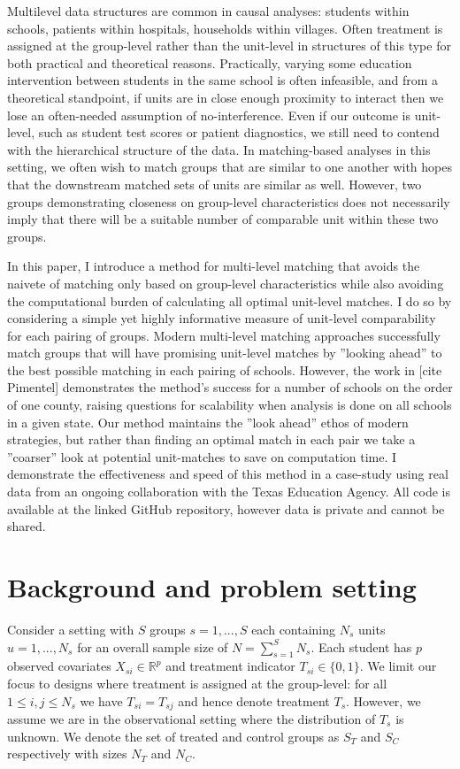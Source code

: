 \documentclass[aoas]{imsart}
\theoremstyle{plain}
\theoremstyle{definition}
\begin{document}
Multilevel data structures are common in causal analyses: students within schools, patients within hospitals,
households within villages. Often treatment is assigned at the group-level rather than the unit-level in structures of this type for both practical and theoretical reasons. Practically, varying some education intervention
between students in the same school is often infeasible, and from a theoretical standpoint, if units are in
close enough proximity to interact then we lose an often-needed assumption of no-interference. Even if our
outcome is unit-level, such as student test scores or patient diagnostics, we still need to contend with the
hierarchical structure of the data. In matching-based analyses in this setting, we often wish to match groups
that are similar to one another with hopes that the downstream matched sets of units are similar as well.
However, two groups demonstrating closeness on group-level characteristics does not necessarily imply that
there will be a suitable number of comparable unit within these two groups. 

In this paper, I introduce a method for multi-level matching that avoids the naivete of matching only
based on group-level characteristics while also avoiding the computational burden of calculating all optimal
unit-level matches. I do so by considering a simple yet highly informative measure of unit-level comparability
for each pairing of groups. Modern multi-level matching approaches successfully match groups that will have
promising unit-level matches by ”looking ahead” to the best possible matching in each pairing of schools.
However, the work in [cite Pimentel] demonstrates the method's success for a number of schools on the order of one county, raising questions for scalability when analysis is done on all schools in a given state.
Our method
maintains the ”look ahead” ethos of modern strategies, but rather than finding an optimal match in each
pair we take a ”coarser” look at potential unit-matches to save on computation time. I demonstrate the
effectiveness and speed of this method in a case-study using real data from an ongoing collaboration with
the Texas Education Agency. All code is available at the linked GitHub repository, however data is private
and cannot be shared.

\section{Background and problem setting}
Consider a setting with $S$ groups $s = 1, ..., S$ each containing $N_s$ units $u = 1, ..., N_s$ for an overall sample size of $N = \sum_{s=1}^{S} N_s$. Each student has $p$ observed covariates $X_{si} \in \mathbb{R}^{p}$ and treatment indicator $T_{si} \in \{0, 1\}$. We limit our focus to designs where treatment is assigned at the group-level: for all $1 \leq i,j \leq N_s$ we have $T_{si} = T_{sj}$ and hence denote treatment $T_s$. However, we assume we are in the observational setting where the distribution of $T_s$ is unknown. We denote the set of treated and control groups as $S_T$ and $S_C$ respectively with sizes $N_T$ and $N_C$. 
\end{document}
